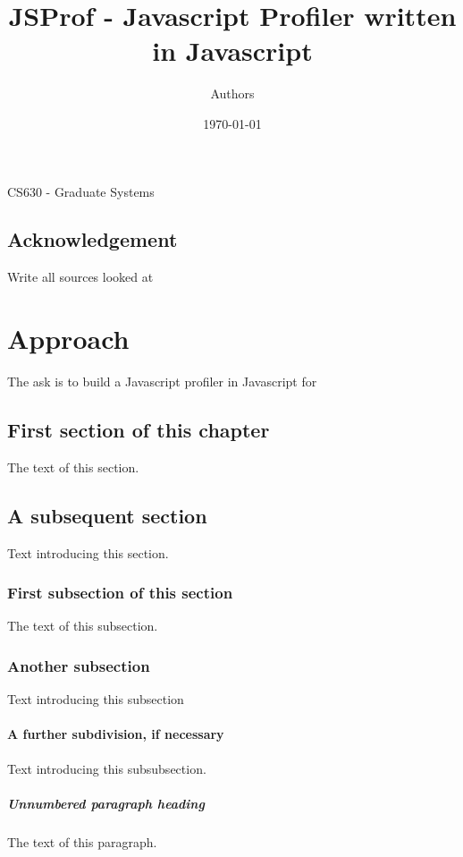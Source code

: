 \documentclass[a4paper, 12pt, notitlepage]{report}
\title{JSProf - Javascript Profiler written in Javascript } %
\author{Authors} %
\date{\today} %
\begin{document}
\maketitle
\begin{center}
CS630 - Graduate Systems
\end{center}
\thispagestyle{empty}
\newpage
\section*{Acknowledgement} %
Write all sources looked at
\\[12pt]

\tableofcontents 


\chapter{Approach}
%
The ask is to build a Javascript profiler in Javascript for 

\section{First section of this chapter}
%
The text of this section.

\section{A subsequent section}
%
Text introducing this section.

\subsection{First subsection of this section}
%
The text of this subsection.

\subsection{Another subsection}
%
Text introducing this subsection

\subsubsection{A further subdivision, if necessary}
%
Text introducing this subsubsection.

\paragraph{Unnumbered paragraph heading}
The text of this paragraph.
\end{document}
